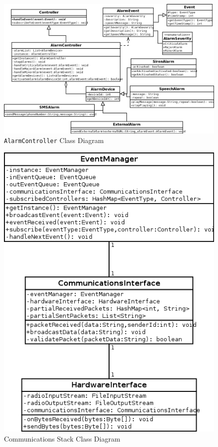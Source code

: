 \documentclass{report}
\begin{document}
\begin{landscape}
\begin{figure}[hp]
    \caption{\texttt{AlarmController} Class Diagram}
    \label{fig:alarm_controller_class_diagram}
    \vspace{50pt}
    \includegraphics[scale=0.5]{alarm_controller_class_diagram.png}
\end{figure}
\end{landscape}

\begin{figure}[hp]
  \centering
  \caption{Communications Stack Class Diagram}
  \label{fig:communications_stack_class_diagram}
  \includegraphics[scale=0.5]{communication_stack_class_diagram}
\end{figure}
\end{document}
